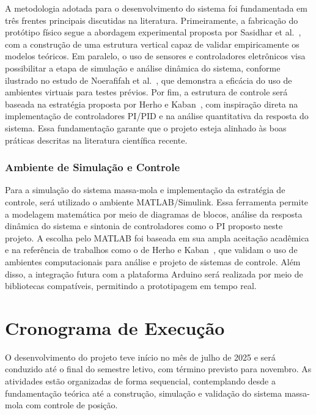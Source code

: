 \documentclass[9pt,a4paper,twocolumn,twoside]{tau-class/tau}
\begin{document}
    A metodologia adotada para o desenvolvimento do sistema foi fundamentada em três frentes principais discutidas na literatura. Primeiramente, a fabricação do protótipo físico segue a abordagem experimental proposta por Sasidhar et al.~\cite{sasidhar2025}, com a construção de uma estrutura vertical capaz de validar empiricamente os modelos teóricos. Em paralelo, o uso de sensores e controladores eletrônicos visa possibilitar a etapa de simulação e análise dinâmica do sistema, conforme ilustrado no estudo de Noerafifah et al.~\cite{noerafifah2025}, que demonstra a eficácia do uso de ambientes virtuais para testes prévios. Por fim, a estrutura de controle será baseada na estratégia proposta por Herho e Kaban~\cite{herho2025}, com inspiração direta na implementação de controladores PI/PID e na análise quantitativa da resposta do sistema. Essa fundamentação garante que o projeto esteja alinhado às boas práticas descritas na literatura científica recente.

    \subsubsection*{Ambiente de Simulação e Controle}

    Para a simulação do sistema massa-mola e implementação da estratégia de controle, será utilizado o ambiente MATLAB/Simulink. Essa ferramenta permite a modelagem matemática por meio de diagramas de blocos, análise da resposta dinâmica do sistema e sintonia de controladores como o PI proposto neste projeto. A escolha pelo MATLAB foi baseada em sua ampla aceitação acadêmica e na referência de trabalhos como o de Herho e Kaban~\cite{herho2025}, que validam o uso de ambientes computacionais para análise e projeto de sistemas de controle. Além disso, a integração futura com a plataforma Arduino será realizada por meio de bibliotecas compatíveis, permitindo a prototipagem em tempo real.

\section{Cronograma de Execução}

    O desenvolvimento do projeto teve início no mês de julho de 2025 e será conduzido até o final do semestre letivo, com término previsto para novembro. As atividades estão organizadas de forma sequencial, contemplando desde a fundamentação teórica até a construção, simulação e validação do sistema massa-mola com controle de posição.
\end{document}
